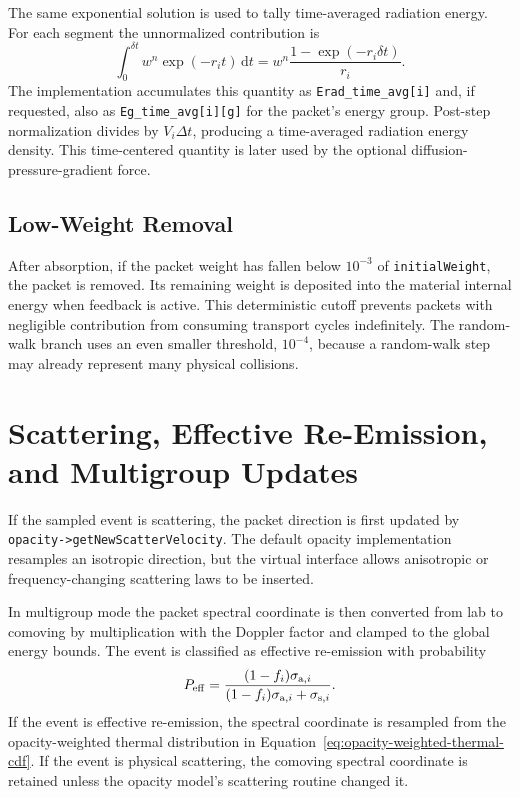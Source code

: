 \documentclass[11pt]{article}
\newcommand{\dt}{\Delta t}
\newcommand{\dd}{\mathrm{d}}
\begin{document}
The same exponential solution is used to tally time-averaged radiation energy.
For each segment the unnormalized contribution is
\begin{equation}
  \int_0^{\delta t} w^n\exp(-r_i t)\,\dd t
  =
  w^n\frac{1-\exp(-r_i\delta t)}{r_i}.
  \label{eq:time-average-segment}
\end{equation}
The implementation accumulates this quantity as
\texttt{Erad\_time\_avg[i]} and, if requested, also as
\texttt{Eg\_time\_avg[i][g]} for the packet's energy group. Post-step
normalization divides by \(V_i\dt\), producing a time-averaged radiation energy
density. This time-centered quantity is later used by the optional
diffusion-pressure-gradient force.

\subsection{Low-Weight Removal}

After absorption, if the packet weight has fallen below \(10^{-3}\) of
\texttt{initialWeight}, the packet is removed. Its remaining weight is deposited
into the material internal energy when feedback is active. This deterministic
cutoff prevents packets with negligible contribution from consuming transport
cycles indefinitely. The random-walk branch uses an even smaller threshold,
\(10^{-4}\), because a random-walk step may already represent many physical
collisions.

\section{Scattering, Effective Re-Emission, and Multigroup Updates}

If the sampled event is scattering, the packet direction is first updated by
\texttt{opacity->getNewScatterVelocity}. The default opacity implementation
resamples an isotropic direction, but the virtual interface allows anisotropic
or frequency-changing scattering laws to be inserted.

In multigroup mode the packet spectral coordinate is then converted from lab to
comoving by multiplication with the Doppler factor and clamped to the global
energy bounds. The event is classified as effective re-emission with
probability
\begin{equation}
  P_{\rm eff}
  =
  \frac{(1-f_i)\sigma_{{\rm a},i}}
       {(1-f_i)\sigma_{{\rm a},i}+\sigma_{{\rm s},i}}.
  \label{eq:effective-scattering-probability}
\end{equation}
If the event is effective re-emission, the spectral coordinate is resampled
from the opacity-weighted thermal distribution in
Equation~\eqref{eq:opacity-weighted-thermal-cdf}. If the event is physical
scattering, the comoving spectral coordinate is retained unless the opacity
model's scattering routine changed it.
\end{document}
